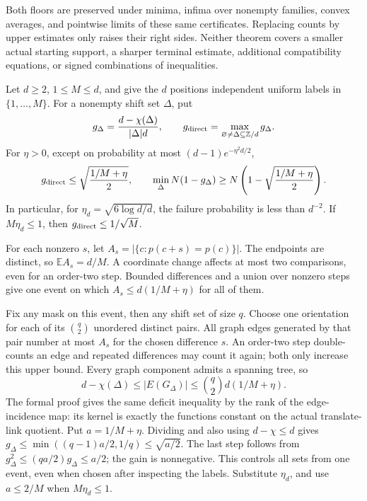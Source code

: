 Both floors are preserved under minima, infima over nonempty families,
convex averages, and pointwise limits of these same certificates. Replacing
counts by upper estimates only raises their right sides. Neither theorem
covers a smaller actual starting support, a sharper terminal estimate,
additional compatibility equations, or signed combinations of inequalities.

\begin{theorem}\label{thm:direct-method-floor}
Let $d\ge2$, $1\le M\le d$, and give the $d$ positions independent uniform
labels in $\{1,\ldots,M\}$. For a nonempty shift set $\Delta$, put
\[
 g_\Delta=\frac{d-\chi(\Delta)}{|\Delta|d},\qquad
 g_{\rm direct}=\max_{\varnothing\ne\Delta\subseteq\mathbb Z/d}g_\Delta.
\]
For $\eta>0$, except on probability at most
$(d-1)e^{-\eta^2d/2}$,
\[
 g_{\rm direct}\le\sqrt{\frac{1/M+\eta}{2}},\qquad
 \min_\Delta N(1-g_\Delta)
       \ge N\left(1-\sqrt{\frac{1/M+\eta}{2}}\right).
\]
In particular, for $\eta_d=\sqrt{6\log d/d}$, the failure probability is
less than $d^{-2}$. If $M\eta_d\le1$, then $g_{\rm direct}\le1/\sqrt M$.
\end{theorem}

\begin{outline}
For each nonzero $s$, let $A_s=|\{c:p(c+s)=p(c)\}|$. The endpoints
are distinct, so $\mathbb EA_s=d/M$. A coordinate change affects at most
two comparisons, even for an order-two step. Bounded differences and a
union over nonzero steps give one event on which
$A_s\le d(1/M+\eta)$ for all of them.

Fix any mask on this event, then any shift set of size $q$. Choose one
orientation for each of its $\binom q2$ unordered distinct pairs. All
graph edges generated by that pair number at most $A_s$ for the chosen
difference $s$. An order-two step double-counts an edge and repeated
differences may count it again; both only increase this upper bound.
Every graph component admits a spanning tree, so
\[
 d-\chi(\Delta)\le |E(G_\Delta)|
       \le\binom q2 d(1/M+\eta).
\]
The formal proof gives the same deficit inequality by the rank of the
edge-incidence map: its kernel is exactly the functions constant on the
actual translate-link quotient. Put $a=1/M+\eta$. Dividing and also using
$d-\chi\le d$ gives
$g_\Delta\le\min((q-1)a/2,1/q)\le\sqrt{a/2}$. The last step follows
from $g_\Delta^2\le(q a/2)g_\Delta\le a/2$; the gain is nonnegative.
This controls all sets from one event, even when chosen after inspecting
the labels. Substitute $\eta_d$, and use $a\le2/M$ when $M\eta_d\le1$.
\end{outline}

